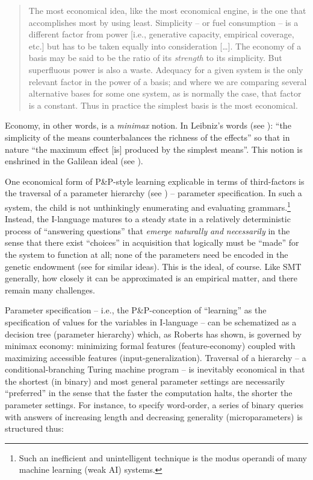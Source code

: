 \documentclass[output=paper]{langsci/langscibook}
\begin{document}
\begin{quote}The most economical idea, like the most economical engine, is the one that accomplishes
most by using least. Simplicity – or fuel consumption – is a different factor
from power [i.e., generative capacity, empirical coverage, etc.] but has to be
taken equally into consideration […]. The economy of a basis may be said to be
the ratio of its \emph{strength} to its simplicity. But superfluous power is
also a waste. Adequacy for a given system is the only relevant factor in the
power of a basis; and where we are comparing several alternative bases for some
one system, as is normally the case, that factor is a constant. Thus in
practice the simplest basis is the most economical.\\\hbox{}\hfill\hbox{\citep[111]{Goodman1943}}\end{quote}
Economy, in other words, is a \emph{minimax} notion. In Leibniz’s words (see
\citealt{RobertsWatumull2015}): “the simplicity of the means counterbalances
the richness of the effects” so that in nature “the maximum effect [is]
produced by the simplest means”. This notion is enshrined in the Galilean ideal
(see \citealt{Chomsky2002}).

One economical form of P\&P-style learning explicable in terms of third-factors
is the traversal of a parameter hierarchy (see
\citealt{Roberts2012,Biberauer2016c}) – parameter specification. In such a
system, the child is not unthinkingly enumerating and evaluating
grammars.\footnote{Such an inefficient and unintelligent technique is the
modus operandi of many machine learning (weak AI) systems.}
Instead, the I-language matures to a steady state in a relatively deterministic
process of “answering questions” that \emph{emerge} \emph{naturally} \emph{and}
\emph{necessarily} in the sense that there exist “choices” in
acquisition that logically must be “made” for the
system to function at all; none of the parameters need be encoded in the
genetic endowment (see \citealt{ObataEtAl2015} for similar ideas). This is the
ideal, of course. Like \gls{SMT} generally, how
closely it can be approximated is an empirical matter, and there remain many
challenges.

Parameter specification – i.e., the P\&P-conception of “learning”
as the specification of values for the variables in I-language – can be
schematized as a decision tree (parameter hierarchy) which, as Roberts has
shown, is governed by minimax economy: minimizing formal features
(feature-economy) coupled with maximizing accessible features
(input-generalization). Traversal of a hierarchy – a conditional-branching
Turing machine program – is inevitably economical in that the shortest (in
binary) and most general parameter settings are necessarily “preferred” in the
sense that the faster the computation halts, the shorter the parameter
settings. For instance, to specify word-order, a series of binary queries with
answers of increasing length and decreasing generality (microparameters) is
structured thus:
\end{document}
